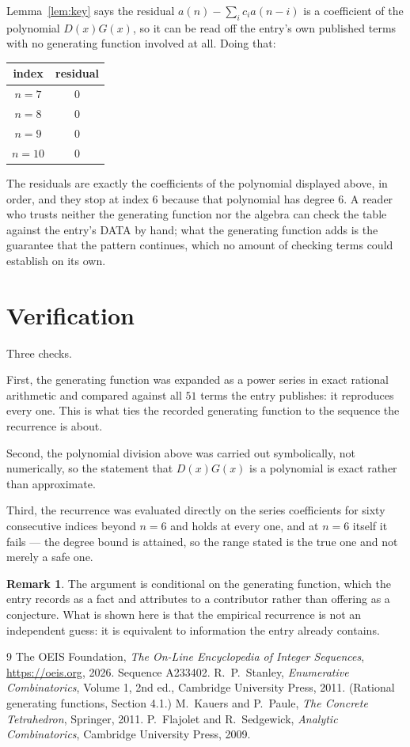 \documentclass[11pt,a4paper]{article}
\theoremstyle{plain}
\theoremstyle{definition}
\newtheorem{remark}[theorem]{Remark}
\begin{document}
Lemma~\ref{lem:key} says the residual $a(n)-\sum_ic_ia(n-i)$ is a coefficient of the
polynomial $D(x)G(x)$, so it can be read off the entry's own published terms with no
generating function involved at all. Doing that:
\begin{center}
\begin{tabular}{cc}
index & residual \\ \hline
$n=7$ & $0$ \\
$n=8$ & $0$ \\
$n=9$ & $0$ \\
$n=10$ & $0$
\end{tabular}
\end{center}
The residuals are exactly the coefficients of the polynomial displayed above, in order, and
they stop at index $6$ because that polynomial has degree $6$. A reader who trusts
neither the generating function nor the algebra can check the table against the entry's DATA
by hand; what the generating function adds is the guarantee that the pattern continues, which
no amount of checking terms could establish on its own.

\section{Verification}

Three checks.

First, the generating function was expanded as a power series in exact rational arithmetic and
compared against all $51$ terms the entry publishes: it reproduces every one. This is
what ties the recorded generating function to the sequence the recurrence is about.

Second, the polynomial division above was carried out symbolically, not numerically, so the
statement that $D(x)G(x)$ is a polynomial is exact rather than approximate.

Third, the recurrence was evaluated directly on the series coefficients for sixty consecutive
indices beyond $n=6$ and holds at every one, and at $n=6$ itself it fails --- the
degree bound is attained, so the range stated is the true one and not merely a safe one.

\begin{remark}
The argument is conditional on the generating function, which the entry records as a fact and
attributes to a contributor rather than offering as a conjecture. What is shown here is that
the empirical recurrence is not an independent guess: it is equivalent to information the
entry already contains.
\end{remark}

\begin{thebibliography}{9}
 The OEIS Foundation, \emph{The On-Line Encyclopedia of Integer
Sequences}, \url{https://oeis.org}, 2026. Sequence A233402.
 R.~P.~Stanley, \emph{Enumerative Combinatorics}, Volume 1, 2nd ed.,
Cambridge University Press, 2011. (Rational generating functions, Section 4.1.)
 M.~Kauers and P.~Paule, \emph{The Concrete Tetrahedron}, Springer, 2011.
 P.~Flajolet and R.~Sedgewick, \emph{Analytic Combinatorics}, Cambridge
University Press, 2009.
\end{thebibliography}
\end{document}
